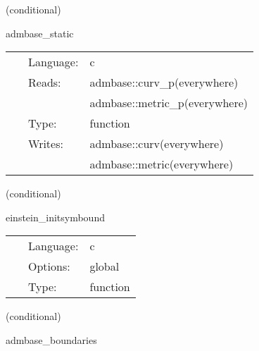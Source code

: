 \documentclass{article}
\begin{document}
\vspace{5mm}

   (conditional) 

\hspace{5mm} admbase\_static 

\hspace{5mm}{\it copy the metric and extrinsic curvature to the current time level } 


\hspace{5mm}

 \begin{tabular*}{160mm}{cll} 
~ & Language:  & c \\ 
~ & Reads:  & admbase::curv\_p(everywhere) \\ 
~& ~ &admbase::metric\_p(everywhere)\\ 
~ & Type:  & function \\ 
~ & Writes:  & admbase::curv(everywhere) \\ 
~& ~ &admbase::metric(everywhere)\\ 
\end{tabular*} 


\vspace{5mm}

   (conditional) 

\hspace{5mm} einstein\_initsymbound 

\hspace{5mm}{\it set up gf symmetries } 


\hspace{5mm}

 \begin{tabular*}{160mm}{cll} 
~ & Language:  & c \\ 
~ & Options:  & global \\ 
~ & Type:  & function \\ 
\end{tabular*} 


\vspace{5mm}

   (conditional) 

\hspace{5mm} admbase\_boundaries 

\hspace{5mm}{\it select admbase boundary conditions - may be required for mesh refinement } 


\hspace{5mm}
\end{document}
